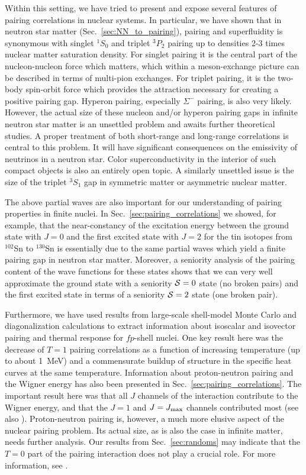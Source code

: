 \documentclass[rmp,preprint,aps,floatfix]{revtex4}
\begin{document}
Within this setting, we have 
tried to present and expose several features of pairing 
correlations in nuclear systems. 
In particular, we have shown that in neutron star matter 
(Sec.~\ref{sec:NN_to_pairing}), pairing and superfluidity is synonymous with
singlet $^1S_0$ and triplet $^3P_2$ pairing up to densities 2-3 times nuclear
matter saturation density. 
For singlet pairing it is the central part of the nucleon-nucleon 
force which matters, which within a meson-exchange picture  
can be described in terms of multi-pion exchanges. 
For triplet pairing, it is the two-body spin-orbit force which provides
the attraction necessary for creating a positive pairing gap.
Hyperon pairing, especially $\Sigma^-$ pairing, is also
very likely. However, the actual size of these 
nucleon and/or hyperon pairing gaps
in infinite neutron star matter is an unsettled 
problem and awaits further theoretical studies.
A proper treatment of both short-range and long-range correlations 
is central to this problem.
It will have significant consequences on the emissivity of 
neutrinos in a neutron star. Color superconductivity in the interior of such 
compact objects is also an entirely open topic. A similarly unsettled issue 
is the size of 
the triplet $^3S_1$ gap in symmetric matter or asymmetric nuclear matter. 


The above partial waves are also important for our understanding of pairing 
properties in finite nuclei. In Sec.~\ref{sec:pairing_correlations} 
we showed, for example, that the near-constancy 
of the excitation energy between the ground state 
with $J=0$ and the first excited state with $J=2$ 
for the tin isotopes from $^{102}$Sn to $^{130}$Sn is essentially due to the 
same partial waves which yield a finite pairing gap in neutron star matter.
Moreover, a seniority analysis of the pairing content of the wave functions 
for these states shows that we can very well approximate the ground state 
with a seniority ${\cal S} = 0$ state (no broken pairs) and the first 
excited state in terms of a 
seniority   ${\cal S} = 2$ state (one broken pair).

Furthermore, we have used results from large-scale shell-model Monte Carlo 
and diagonalization
calculations to extract information about isoscalar and isovector pairing
and thermal response 
for $fp$-shell nuclei. 
One key result here was the decrease of $T=1$ pairing correlations 
as a function of increasing temperature (up to about 1~MeV) 
and a commensurate buildup of structure in the specific heat 
curves at the same temperature. 
Information about proton-neutron pairing and the Wigner 
energy has also been presented in Sec.~\ref{sec:pairing_correlations}.
The important result here was that all $J$ channels of the 
interaction contribute to the
Wigner energy, and that the $J=1$ and $J=J_{\rm max}$ channels contributed
most (see also \cite{poves98}).
Proton-neutron pairing is, however, a much more elusive  aspect 
of the nuclear pairing problem. 
Its actual size, as is also the case in infinite 
matter, needs further analysis. 
Our results from Sec.~\ref{sec:randoms} may
indicate that the $T=0$ part of the pairing
interaction does not play a crucial role. For more information, see
\cite{volodya1996,volya_2}. 
\end{document}
